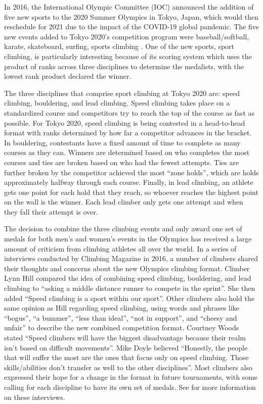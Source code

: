 \documentclass[12pt]{article}
\begin{document}
In 2016, the International Olympic Committee (IOC) announced the
addition of five new sports to the 2020 Summer Olympics in Tokyo, Japan,
which would then reschedule for 2021 due to the impact of the COVID-19
global pandemic. The five new events added to Tokyo 2020's competition
program were baseball/softball, karate, skateboard, surfing, sports
climbing \citep{ioc2016}. One of the new sports, sport climbing, is
particularly interesting because of its scoring system which uses the
product of ranks across three disciplines to determine the medalists,
with the lowest rank product declared the winner.

The three disciplines that comprise sport climbing at Tokyo 2020 are:
speed climbing, bouldering, and lead climbing. Speed climbing takes
place on a standardized course and competitors try to reach the top of
the course as fast as possible. For Tokyo 2020, speed climbing is being
contested in a head-to-head format with ranks determined by how far a
competitor advances in the bracket. In bouldering, contestants have a
fixed amount of time to complete as many courses as they can. Winners
are determined based on who completes the most courses and ties are
broken based on who had the fewest attempts. Ties are further broken by
the competitor achieved the most ``zone holds'', which are holds
approximately halfway through each course. Finally, in lead climbing, an
athlete gets one point for each hold that they reach, so whoever reaches
the highest point on the wall is the winner. Each lead climber only gets
one attempt and when they fall their attempt is over.

The decision to combine the three climbing events and only award one set
of medals for both men's and women's events in the Olympics has received
a large amount of criticism from climbing athletes all over the world.
In a series of interviews conducted by Climbing Magazine in 2016, a
number of climbers shared their thoughts and concerns about the new
Olympics climbing format. Climber Lynn Hill compared the idea of
combining speed climbing, bouldering, and lead climbing to ``asking a
middle distance runner to compete in the sprint''. She then added
``Speed climbing is a sport within our sport''. Other climbers also hold
the same opinion as Hill regarding speed climbing, using words and
phrases like ``bogus'', ``a bummer'', ``less than ideal'', ``not in
support'', and ``cheesy and unfair'' to describe the new combined
competition format. Courtney Woods stated ``Speed climbers will have the
biggest disadvantage because their realm isn't based on difficult
movements''. Mike Doyle believed ``Honestly, the people that will suffer
the most are the ones that focus only on speed climbing. Those
skills/abilities don't transfer as well to the other disciplines''. Most
climbers also expressed their hope for a change in the format in future
tournaments, with some calling for each discipline to have its own set
of medals. See \citet{blanchard2016} for more information on these
interviews.
\end{document}

